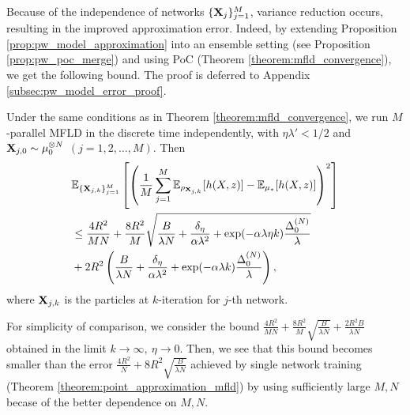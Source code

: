 Because of the independence of networks $\{\mathbf{X}_j\}_{j=1}^M$, variance reduction occurs, resulting in the improved approximation error. Indeed, by extending Proposition \ref{prop:pw_model_approximation} into an ensemble setting (see Proposition \ref{prop:pw_poc_merge}) and using PoC (Theorem \ref{theorem:mfld_convergence}), we get the following bound.
The proof is deferred to Appendix \ref{subsec:pw_model_error_proof}.
\begin{theorem}\label{theorem:point_approximation_multiple_mfld}
    Under the same conditions as in Theorem \ref{theorem:mfld_convergence}, we run $M$-parallel MFLD in the discrete time independently, with $\eta \lambda' < 1/2$ and $\vX_{j,0} \sim \tensor[\mu,N]_0$ $(j=1,2,\ldots,M)$. Then
    \begin{align*} 
        &\bE_{\{\vX_{j,k}\}_{j=1}^M}\left[ \left( \frac{1}{M}\sum_{j=1}^M\bE_{\rho_{\vX_{j,k}}}[ h(X,z)] - \bE_{\mu_*}[h(X,z)]\right)^2 \right] \\
        &\leq \frac{4R^2}{MN} + \frac{8R^2}{M}\sqrt{\frac{B}{\lambda N} + \frac{\delta_\eta}{\alpha \lambda^2} + \exp(-\alpha \lambda \eta k) \frac{\pow[\Delta,N]_0}{\lambda}} \\
        &+2R^2 \left(\frac{B}{\lambda N} + \frac{\delta_\eta}{\alpha \lambda^2} + \exp(-\alpha \lambda k) \frac{\pow[\Delta,N]_0}{\lambda}\right), 
    \end{align*}
    where $\mathbf{X}_{j,k}$ is the particles at $k$-iteration for $j$-th network.
\end{theorem}
For simplicity of comparison, we consider the bound $\frac{4R^2}{MN} + \frac{8R^2}{M} \sqrt{\frac{B}{\lambda N}} + \frac{2R^2 B}{\lambda N}$ obtained in the limit $k\to \infty,~\eta\to0$. Then, we see that this bound becomes smaller than the error $\frac{4R^2}{N} + 8R^2 \sqrt{\frac{B}{\lambda N}}$ achieved by single network training (Theorem \ref{theorem:point_approximation_mfld}) by using sufficiently large $M,N$ becase of the better dependence on $M,N$.



